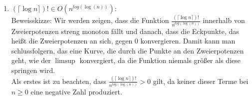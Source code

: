 \documentclass[11pt,a4paper,ngerman]{article}
\begin{document}
\begin{description}
\begin{enumerate}[\bfseries 1.]
\item
$(\lceil \log{n} \rceil)! \in O (n^{log{(\log{(n)})}})$: \\

Beweisskizze: Wir werden zeigen, dass die Funktion $\frac{(\lceil \log{n} \rceil)!}{n^{log{(\log{(n)})}}}$ innerhalb von Zweierpotenzen streng monoton fällt und danach, dass die Eckpunkte, das heißt die Zweierpotenzen an sich, gegen 0 konvergieren. Damit kann man schlussfolgern, das eine Kurve, die durch die Punkte an den Zweierpotenzen geht, wie der $\limsup$ konvergiert, da die Funktion niemals größer als diese springen wird.\\
Als erstes ist zu beachten, dass  $\frac{(\lceil \log{n} \rceil)!}{n^{log{(\log{(n)})}}} > 0$ gilt, da keiner dieser Terme bei $n\geq 0$ eine negative Zahl produziert.

\end{enumerate}
\end{description}
\end{document}

